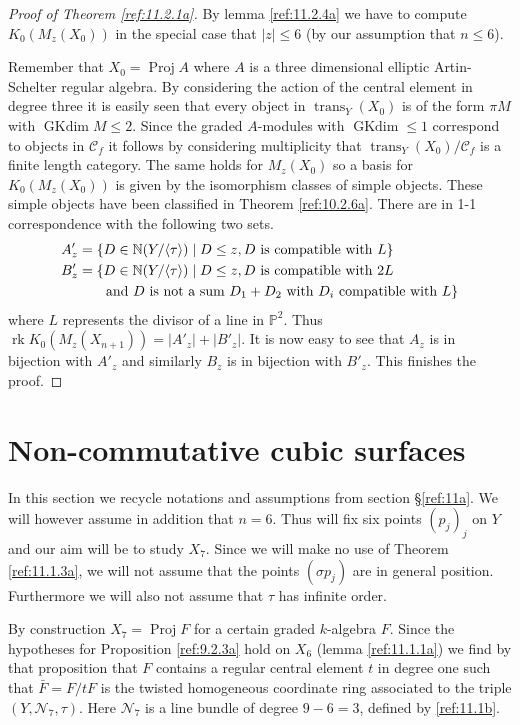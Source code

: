 \documentclass{amsproc}
\def \PP{{\mathbb P}}
\def \NN{{\mathbb N}}
\def\Cscr{{\mathcal C}}
\def\Nscr{{\mathcal N}}
\def\trans{\operatorname{trans}}
\def\rk{\operatorname{rk}}
\def\Proj{\operatorname {Proj}}
\let\oldtext\text
\def\text#1{\oldtext{\upshape #1}}
\DeclareMathOperator{\GKdim}{GKdim}
\theoremstyle{definition}
\theoremstyle{remark}
\numberwithin{equation}{section}
\numberwithin{table}{section}
\numberwithin{figure}{section}
\begin{document}
\begin{proof}[Proof of Theorem \ref{ref:11.2.1a}]
By lemma \ref{ref:11.2.4a} we have to compute $K_0(M_z(X_0))$ in the
special case that $|z|\le 6$ (by our assumption that $n\le 6$). 

Remember that $X_0=\Proj A$ where $A$ is a three dimensional elliptic
Artin-Schelter regular algebra. By considering the
action of the central element in degree three it is easily seen that
every object in $\trans_Y(X_0)$ is of the form $\pi M$ with $\GKdim
M\le 2$. Since the graded $A$-modules with $\GKdim \le 1$ correspond
to objects in $\Cscr_f$ \cite{ATV1} it follows by considering
multiplicity that $\trans_Y(X_0)/\Cscr_f$ is a finite length category.
The same holds for $M_z(X_0)$ so a basis for $K_0(M_z(X_0))$ is given
by the isomorphism classes of simple objects. These simple objects
have been classified in Theorem \ref{ref:10.2.6a}. There are in 1-1
correspondence with the following two sets.
\begin{align*}
  A'_z&=\{D\in \NN(Y/\langle\tau\rangle)\mid  D\le z, \text{$D$
    is compatible
    with $L$}\}\\
    B'_z&=\{D\in\NN(Y/\langle\tau\rangle)\mid  D\le z,\text{$D$
      is compatible with $2L$}\\
&\qquad \text{ and $D$ is not a sum $D_1+D_2$ with
    $D_i$ compatible with $L$}\}
\end{align*}
where $L$ represents the divisor of a line in $\PP^2$. Thus
$\rk K_0(M_z(X_{n+1}))=|A'_z|+|B'_z|$. It is now easy to see that
$A_z$ is in bijection with $A'_z$ and similarly $B_z$ is in bijection
with $B'_z$. This finishes the proof.
\end{proof}
\section{Non-commutative cubic surfaces}
\label{ref:12a}
 In this section we
recycle notations and assumptions from  section
\S\ref{ref:11a}.  We will
however assume in addition 
 that $n=6$. Thus will fix six points $(p_{j})_{j}$ on
$Y$ and our aim will be to study $X_7$. Since we will make no use
of Theorem \ref{ref:11.1.3a}, we will not assume that the
points $(\sigma p_{j})$ are in general position. Furthermore we will
also not assume that $\tau$ has infinite order.


 By construction $X_7=\Proj F$ for a certain graded
$k$-algebra $F$. Since the hypotheses for Proposition \ref{ref:9.2.3a}
hold on $X_6$ (lemma \ref{ref:11.1.1a}) we find by that proposition that $F$
contains a regular central element $t$ in degree one such that
$\bar{F}=F/tF$ is the twisted homogeneous coordinate ring \cite{AVdB}
associated to the triple $(Y,\Nscr_7,\tau)$. Here $\Nscr_7$ is a
line bundle of degree $9-6=3$, defined by \eqref{ref:11.1b}.
\end{document}
